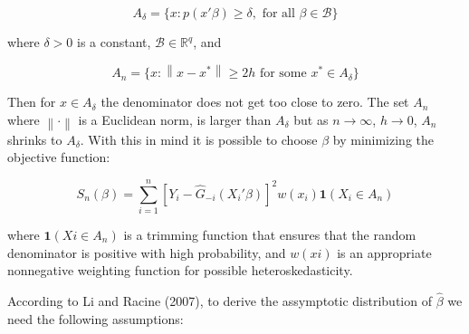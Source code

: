 \documentclass[a4paper]{article}
\newcommand{\norm}[1]{\left\lVert#1\right\rVert}
\begin{document}
\[ A_\delta = \{ x : p(x'\beta) \geq \delta, \text{ for all }  \beta \in \mathcal{B} \}
\]

where $\delta > 0$ is a constant, $\mathcal{B} \in \mathbb{R}^q$, and

\[ A_n = \{ x : \norm{x - x^*} \geq 2h \text{ for some } x^* \in A_\delta \}
\]

Then for $x \in A_\delta$ the denominator does not get too close to zero. The set $A_n$ where $\norm{\cdot}$ is a Euclidean norm, is larger than $A_\delta$ but as $ n \rightarrow \infty $, $h \rightarrow 0$, $A_n$ shrinks to $A_\delta$. With this in mind it is possible to choose $\beta$ by minimizing the objective function:

\begin{equation}
S_n(\beta) = \sum_{i=1}^{n}  [Y_i - \hat{G}_{-i}(X_i'\beta)]^2w(x_i)\mathbf{1}{(X_i \in A_n)}
\end{equation}

where $\mathbf{1}{(Xi \in A_n)}$ is a trimming function that ensures that the random denominator is positive with high probability, and $w(xi)$ is an appropriate nonnegative weighting function for possible heteroskedasticity.

According to Li and Racine (2007), to derive the assymptotic distribution of $\hat{\beta}$ we need the following assumptions:

\newtheorem{theorem}{Theorem}[section]
\end{document}
